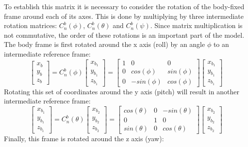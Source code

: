 To establish this matrix it is necessary to consider the rotation of the body-fixed frame around each of its axes\cite{Cook2013}. This is done by multiplying by three intermediate rotation matrices: $C^{b}_{n}(\phi)$, $C^{b}_{n}(\theta)$ and $C^{b}_{n}(\psi)$. Since matrix multiplication is not commutative, the order of these rotations is an important part of the model. The body frame is first rotated around the x axis (roll) by an angle $\phi$ to an intermediate reference frame: 
\[
\begin{bmatrix}
x_{b}\\ y_{b}\\ z_{b}
\end{bmatrix} = C^{b}_{n}(\phi)\begin{bmatrix}
x_{b_{1}}\\ y_{b_{1}}\\ z_{b_{1}}
\end{bmatrix}=
\begin{bmatrix}
1 & 0 & 0\\ 
0 & cos(\phi) & sin(\phi)\\ 
0 & -sin(\phi) & cos(\phi)
\end{bmatrix}
\begin{bmatrix}
x_{b_{1}}\\ y_{b_{1}}\\ z_{b_{1}}
\end{bmatrix}
\]
Rotating this set of coordinates around the y axis (pitch) will result in another intermediate reference frame:
\[
\begin{bmatrix}
x_{b_{1}}\\ y_{b_{1}}\\ z_{b_{1}}
\end{bmatrix} = C^{b}_{n}(\theta)\begin{bmatrix}
x_{b_{2}}\\ y_{b_{2}}\\ z_{b_{2}}
\end{bmatrix}=
\begin{bmatrix}
cos(\theta) & 0 & -sin(\theta)\\ 
0 & 1 & 0\\ 
sin(\theta) &  0 & cos(\theta)
\end{bmatrix}
\begin{bmatrix}
x_{b_{2}}\\ y_{b_{2}}\\ z_{b_{2}}
\end{bmatrix}
\]
Finally, this frame is rotated around the z axis (yaw):
